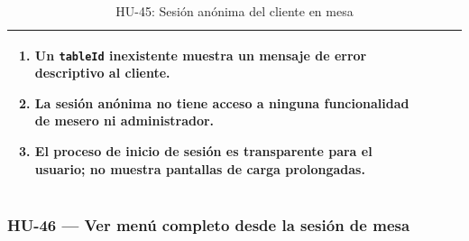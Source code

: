 \begin{table}[H]
\begin{tabularx}{\textwidth}{|>{\bfseries}p{3.5cm}|X|>{\bfseries}p{3.5cm}|X|}
{\begin{enumerate}[leftmargin=1.5em, itemsep=0pt, parsep=2pt, topsep=0pt]
    \item Un \texttt{tableId} inexistente muestra un mensaje de error descriptivo al cliente.
    \item La sesión anónima no tiene acceso a ninguna funcionalidad de mesero ni administrador.
    \item El proceso de inicio de sesión es transparente para el usuario; no muestra pantallas de carga prolongadas.
  \end{enumerate}
} \\
\hline
\end{tabularx}
\caption{HU-45: Sesión anónima del cliente en mesa}
\end{table}

\subsubsection*{HU-46 — Ver menú completo desde la sesión de mesa}

